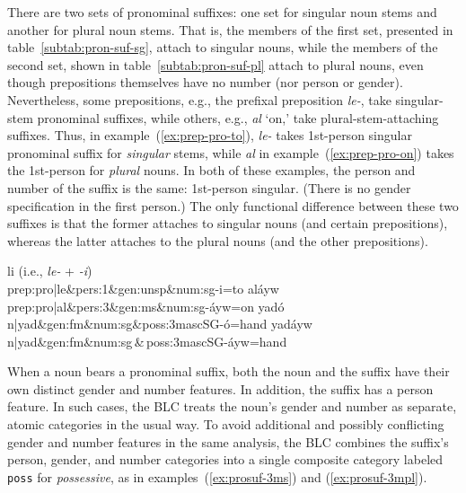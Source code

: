 {\begin{description}
There are two sets
of pronominal suffixes: one set for singular noun stems and another for plural noun stems. 
That is, the members of the first set, presented in table~\ref{subtab:pron-suf-sg}, 
attach to singular nouns, while the members of the second set, shown in table~\ref{subtab:pron-suf-pl} 
attach to plural nouns, 
even though prepositions themselves have no number (nor person or gender). 
Nevertheless, some prepositions, e.g., the prefixal preposition \textit{le-}, 
take singular-stem pronominal suffixes, while others, e.g., \textit{al} `on,'
take plural-stem-attaching suffixes. Thus, in example~(\ref{ex:prep-pro-to}), 
\textit{le-} takes 1st-person singular pronominal suffix for \emph{singular} stems, 
while \textit{al} in example~(\ref{ex:prep-pro-on}) takes the 1st-person 
for \emph{plural} nouns. In both of these examples, the person and number of 
the suffix is the same: 1st-person singular. (There is no gender specification in the first person.)
The only functional difference between these two suffixes is that the former 
attaches to singular nouns (and certain prepositions), whereas the latter 
attaches to the plural nouns (and the other prepositions). 
\begin{exe}
{\selectfont \small
\ex \label{ex:prep-pro-to}
li \qquad \textrm{(i.e., \textit{le-} + \textit{-i})} \\
prep:pro|le\&pers:1\&gen:unsp\&num:sg-i=to
}
\ex \label{ex:prep-pro-on}
{\selectfont \small
{}al\'{a}yw  \\
prep:pro|al\&pers:3\&gen:ms\&num:sg-\'{a}yw=on
}
\ex \label{ex:prosuf-3ms}
{\selectfont \small
yad\'{o} \\
n|yad\&gen:fm\&num:sg\&poss:3mascSG-\'{o}=hand
}
\ex \label{ex:prosuf-3mpl}
{\selectfont \small
yad\'{a}yw \\
n|yad\&gen:fm\&num:sg\,\&\,poss:3mascSG-\'{a}yw=hand
}
\end{exe}

When a noun bears a pronominal suffix, both the noun and the suffix have their 
own distinct gender and number features. In addition, the suffix has a person feature. 
In such cases, the BLC treats the noun's gender and number as separate, atomic
categories in the usual way. To avoid additional and possibly conflicting gender 
and number features in the same
analysis, the BLC combines the suffix's person, gender, and number categories into 
a single composite category labeled \texttt{poss} for \textit{possessive}, as in 
examples~(\ref{ex:prosuf-3ms}) and (\ref{ex:prosuf-3mpl}).


\end{description}}
